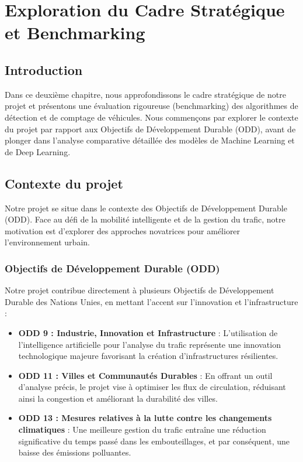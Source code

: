 \chapter{Exploration du Cadre Stratégique et Benchmarking}

\section{Introduction}
Dans ce deuxième chapitre, nous approfondissons le cadre stratégique de notre projet et présentons une évaluation rigoureuse (benchmarking) des algorithmes de détection et de comptage de véhicules. Nous commençons par explorer le contexte du projet par rapport aux Objectifs de Développement Durable (ODD), avant de plonger dans l'analyse comparative détaillée des modèles de Machine Learning et de Deep Learning.

\section{Contexte du projet}
Notre projet se situe dans le contexte des Objectifs de Développement Durable (ODD). Face au défi de la mobilité intelligente et de la gestion du trafic, notre motivation est d'explorer des approches novatrices pour améliorer l'environnement urbain.

\subsection{Objectifs de Développement Durable (ODD)}
Notre projet contribue directement à plusieurs Objectifs de Développement Durable des Nations Unies, en mettant l'accent sur l'innovation et l'infrastructure :

\begin{itemize}
    \item \textbf{ODD 9 : Industrie, Innovation et Infrastructure} : L'utilisation de l'intelligence artificielle pour l'analyse du trafic représente une innovation technologique majeure favorisant la création d'infrastructures résilientes.
    \item \textbf{ODD 11 : Villes et Communautés Durables} : En offrant un outil d'analyse précis, le projet vise à optimiser les flux de circulation, réduisant ainsi la congestion et améliorant la durabilité des villes.
    \item \textbf{ODD 13 : Mesures relatives à la lutte contre les changements climatiques} : Une meilleure gestion du trafic entraîne une réduction significative du temps passé dans les embouteillages, et par conséquent, une baisse des émissions polluantes.
\end{itemize}

